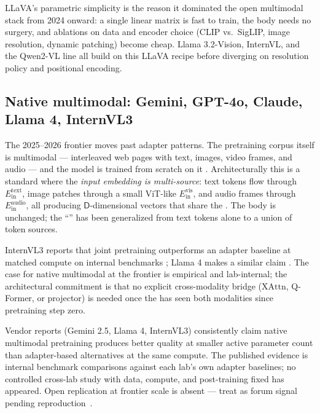 LLaVA's parametric simplicity is the reason it dominated the open
multimodal stack from 2024 onward: a single linear matrix is fast to
train, the  body needs no surgery, and ablations on data and
encoder choice (CLIP vs.\ SigLIP, image resolution, dynamic patching)
become cheap. Llama 3.2-Vision, InternVL, and the Qwen2-VL line all
build on this LLaVA recipe before diverging on resolution policy and
positional encoding.

\subsection{Native multimodal: Gemini, GPT-4o, Claude, Llama 4, InternVL3}
\label{sec:multimodal-native}

The 2025--2026 frontier moves past adapter patterns. The pretraining
corpus itself is multimodal --- interleaved web pages with text,
images, video frames, and audio --- and the model is trained from
scratch on it \citep{meta-llama4,internvl3-2025,gemini2-5}.
Architecturally this is a standard   where the
\emph{input embedding is multi-source}: text tokens flow through
$E_{\text{in}}^{\text{text}}$, image patches through a small
ViT-like $E_{\text{in}}^{\text{vis}}$, and audio frames through
$E_{\text{in}}^{\text{audio}}$, all producing $\mathsf{D}$-dimensional
vectors that share the . The body is unchanged; the
``'' has been generalized from text tokens alone to a union
of token sources. 

InternVL3 reports that joint pretraining outperforms an adapter
baseline at matched compute on internal benchmarks
\citep{internvl3-2025}; Llama 4 makes a similar claim
\citep{meta-llama4}. The case for native multimodal at the frontier is
empirical and lab-internal; the architectural commitment is that no
explicit cross-modality bridge ($\mathrm{XAttn}$, Q-Former, or
projector) is needed once the  has seen both modalities
since pretraining step zero.

\begin{forumsignal}
Vendor reports (Gemini 2.5, Llama 4, InternVL3) consistently claim
native multimodal pretraining produces better quality at smaller active
parameter count than adapter-based alternatives at the same compute.
The published evidence is internal benchmark comparisons against each
lab's own adapter baselines; no controlled cross-lab study with data,
compute, and post-training fixed has appeared. Open replication at
frontier scale is absent --- treat as forum signal pending
reproduction~\citep{internvl3-2025,meta-llama4}.
\end{forumsignal}

